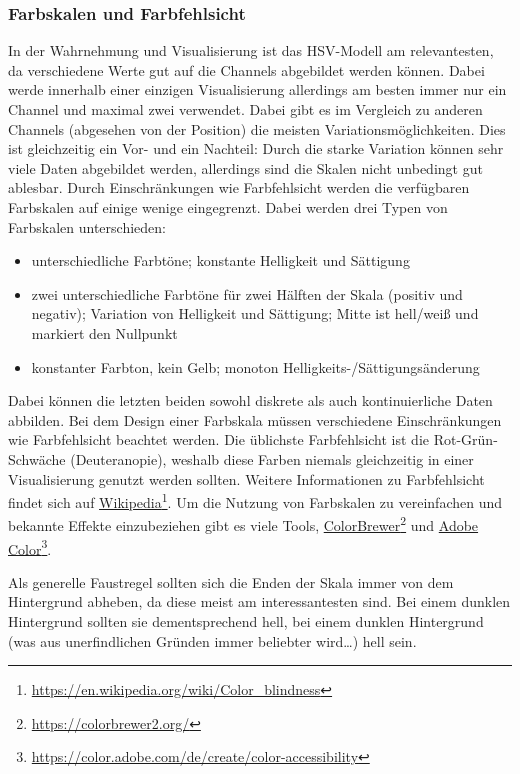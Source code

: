 			\subsubsection{Farbskalen und Farbfehlsicht}
				In der Wahrnehmung und Visualisierung ist das HSV-Modell am relevantesten, da verschiedene Werte gut auf die Channels abgebildet werden können. Dabei werde innerhalb einer einzigen Visualisierung allerdings am besten immer nur ein Channel und maximal zwei verwendet. Dabei gibt es im Vergleich zu anderen Channels (abgesehen von der Position) die meisten Variationsmöglichkeiten. Dies ist gleichzeitig ein Vor- und ein Nachteil: Durch die starke Variation können sehr viele Daten abgebildet werden, allerdings sind die Skalen nicht unbedingt gut ablesbar. Durch Einschränkungen wie Farbfehlsicht werden die verfügbaren Farbskalen auf einige wenige eingegrenzt. Dabei werden drei Typen von Farbskalen unterschieden:
				\begin{itemize}
					\item {} unterschiedliche Farbtöne; konstante Helligkeit und Sättigung
					\item {}   zwei unterschiedliche Farbtöne für zwei Hälften der Skala (\bspw positiv und negativ); Variation von Helligkeit und Sättigung; Mitte ist hell/weiß und markiert den Nullpunkt
					\item {} konstanter Farbton, kein Gelb; monoton Helligkeits-/Sättigungsänderung
				\end{itemize}
				Dabei können die letzten beiden sowohl diskrete als auch kontinuierliche Daten abbilden. Bei dem Design einer Farbskala müssen verschiedene Einschränkungen wie Farbfehlsicht beachtet werden. Die üblichste Farbfehlsicht ist die Rot-Grün-Schwäche (Deuteranopie), weshalb diese Farben niemals gleichzeitig in einer Visualisierung genutzt werden sollten. Weitere Informationen zu Farbfehlsicht findet sich auf \href{https://en.wikipedia.org/wiki/Color_blindness}{Wikipedia}\footnote{\url{https://en.wikipedia.org/wiki/Color_blindness}}. Um die Nutzung von Farbskalen zu vereinfachen und bekannte Effekte einzubeziehen gibt es viele Tools, \bspw \href{https://colorbrewer2.org}{ColorBrewer}\footnote{\url{https://colorbrewer2.org/}} und \href{https://color.adobe.com/de/create/color-accessibility}{Adobe Color}\footnote{\url{https://color.adobe.com/de/create/color-accessibility}}.

				Als generelle Faustregel sollten sich die Enden der Skala immer von dem Hintergrund abheben, da diese meist am interessantesten sind. Bei einem dunklen Hintergrund sollten sie dementsprechend hell, bei einem dunklen Hintergrund (was aus unerfindlichen Gründen immer beliebter wird\dots) hell sein.

